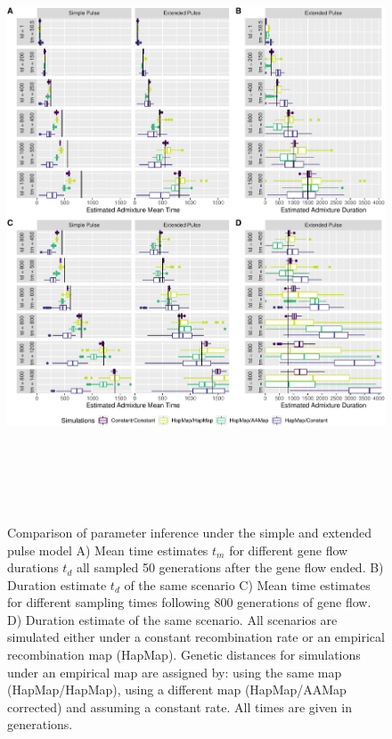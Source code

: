 \documentclass[11pt]{article}
\begin{document}
\begin{figure}
\centering
\includegraphics[width=16cm,height=18cm,keepaspectratio]{ATE_Revisions_files/figure-latex/figCloser_Sampling_Supplement-1.pdf}
\caption{\label{fig:Closer_sampling} Comparison of parameter inference under the simple and extended pulse model  A) Mean time estimates $t_m$ for different gene
flow durations $t_d$ all sampled 50 generations after the gene flow ended. B)
Duration estimate $t_d$ of the same scenario C) Mean time estimates for different sampling times following 800
generations of gene flow. D) Duration estimate of the same scenario. All scenarios are simulated either under a constant recombination rate or an empirical recombination map (HapMap). Genetic distances for simulations under an empirical map are assigned by: using the same map (HapMap/HapMap), using a different map (HapMap/AAMap corrected) and assuming a constant rate. All times are given in generations.}
\end{figure}
\end{document}

